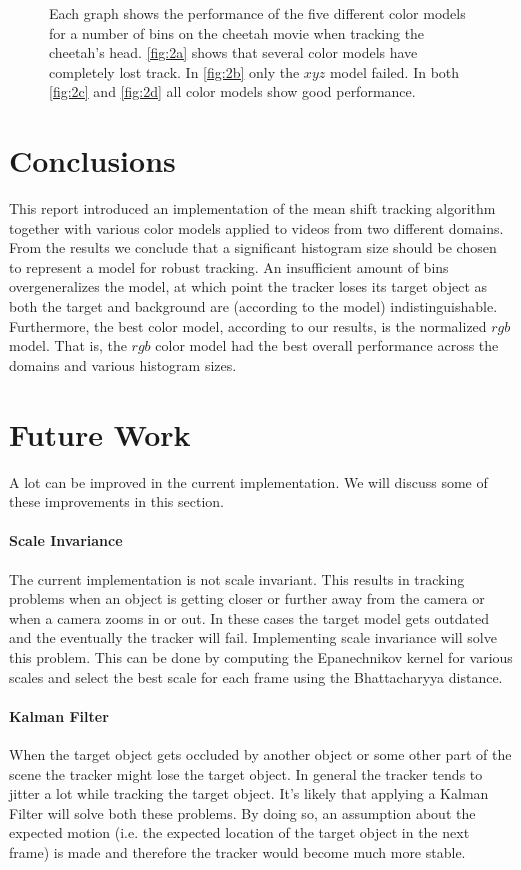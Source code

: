 \documentclass[11pt]{article}
\begin{document}
\begin{figure}[h!]
{\label{fig:2d}
}
\caption{Each graph shows the performance of the five different color models for
a number of bins on the cheetah movie when tracking the cheetah's head.
\ref{fig:2a} shows that several color models have completely lost track. In
\ref{fig:2b} only the $xyz$ model failed. In both \ref{fig:2c} and \ref{fig:2d}
all color models show good performance.}
\label{fig:cheetah}
\end{figure}

\section{Conclusions} \label{sec:conclusion}
This report introduced an implementation of the mean shift tracking algorithm
together with various color models applied to videos from two different domains.
From the results we conclude that a significant histogram size should be chosen
to represent a model for robust tracking. An insufficient amount of bins
overgeneralizes the model, at which point the tracker loses its target object as
both the target and background are (according to the model) indistinguishable.
Furthermore, the best color model, according to our results, is the normalized
$rgb$ model. That is, the $rgb$ color model had the best overall performance
across the domains and various histogram sizes.

\section{Future Work} \label{sec:future}
A lot can be improved in the current implementation. We will discuss some of
these improvements in this section.

\paragraph{Scale Invariance} The current implementation is not scale invariant. This
results in tracking problems when an object is getting closer or further away
from the camera or when a camera zooms in or out. In these cases the target
model gets outdated and the eventually the tracker will fail. Implementing
scale invariance will solve this problem. This can be done by computing the
Epanechnikov kernel for various scales and select the best scale for each
frame using the Bhattacharyya distance.

\paragraph{Kalman Filter} When the target object gets occluded by another object
or some other part of the scene the tracker might lose the target object. In
general the tracker tends to jitter a lot while tracking the target object.
It's likely that applying a Kalman Filter will solve both these problems. By
doing so, an assumption about the expected motion (i.e. the expected location
of the target object in the next frame) is made and therefore the tracker would
become much more stable.
\end{document}
